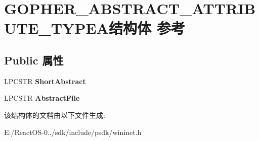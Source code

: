 \hypertarget{struct_g_o_p_h_e_r___a_b_s_t_r_a_c_t___a_t_t_r_i_b_u_t_e___t_y_p_e_a}{}\section{G\+O\+P\+H\+E\+R\+\_\+\+A\+B\+S\+T\+R\+A\+C\+T\+\_\+\+A\+T\+T\+R\+I\+B\+U\+T\+E\+\_\+\+T\+Y\+P\+E\+A结构体 参考}
\label{struct_g_o_p_h_e_r___a_b_s_t_r_a_c_t___a_t_t_r_i_b_u_t_e___t_y_p_e_a}
\subsection*{Public 属性}
\begin{DoxyCompactItemize}
\item 
\mbox{\label{struct_g_o_p_h_e_r___a_b_s_t_r_a_c_t___a_t_t_r_i_b_u_t_e___t_y_p_e_a_a37f84f6dc63cb359321eb23b133ab529}} 
L\+P\+C\+S\+TR {\bfseries Short\+Abstract}
\item 
\mbox{\label{struct_g_o_p_h_e_r___a_b_s_t_r_a_c_t___a_t_t_r_i_b_u_t_e___t_y_p_e_a_ab54434d36d371ebf57bc9a82b84c7f9e}} 
L\+P\+C\+S\+TR {\bfseries Abstract\+File}
\end{DoxyCompactItemize}


该结构体的文档由以下文件生成\+:\begin{DoxyCompactItemize}
\item 
E\+:/\+React\+O\+S-\/0../sdk/include/psdk/wininet.\+h\end{DoxyCompactItemize}
